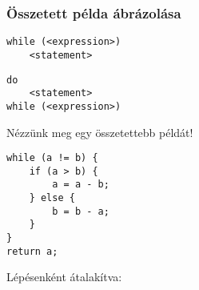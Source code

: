 \subsubsection{Összetett példa ábrázolása}

\begin{minipage}{\balhasab}
\begin{lstlisting}
while (<expression>)
	<statement>
\end{lstlisting}
\end{minipage}
\begin{minipage}{\jobbhasab}
\end{minipage}



\begin{minipage}{\balhasab}
\begin{lstlisting}
do
	<statement>
while (<expression>)
\end{lstlisting}
\end{minipage}
\begin{minipage}{\jobbhasab}
\end{minipage}



Nézzünk meg egy összetettebb példát!

\begin{minipage}{\balhasab}
\begin{lstlisting}
while (a != b) {
	if (a > b) {
		a = a - b;
	} else {
		b = b - a;
	}
}
return a;
\end{lstlisting}
\end{minipage}
\begin{minipage}{\jobbhasab}
\end{minipage}


Lépésenként átalakítva:

\begin{minipage}{0.2\linewidth}
\end{minipage}
\begin{minipage}{0.35\linewidth}
\end{minipage}
\begin{minipage}{0.45\linewidth}
\end{minipage}

